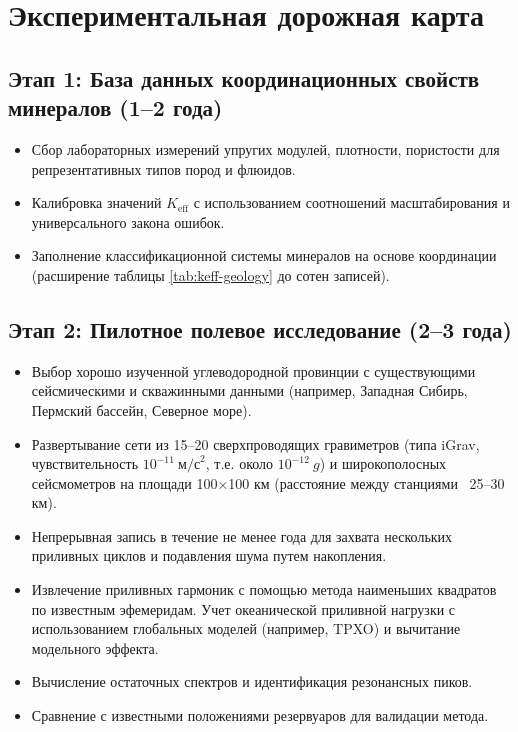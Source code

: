\documentclass[12pt,a4paper]{article}
\theoremstyle{remark}
\newcommand{\Keff}{K_{\mathrm{eff}}}
\begin{document}
	\section{Экспериментальная дорожная карта}
	\label{sec:roadmap}
	
	\subsection{Этап 1: База данных координационных свойств минералов (1–2 года)}
	
	\begin{itemize}
		\item Сбор лабораторных измерений упругих модулей, плотности, пористости для репрезентативных типов пород и флюидов.
		\item Калибровка значений $\Keff$ с использованием соотношений масштабирования и универсального закона ошибок.
		\item Заполнение классификационной системы минералов на основе координации (расширение таблицы \ref{tab:keff-geology} до сотен записей).
	\end{itemize}
	
	\subsection{Этап 2: Пилотное полевое исследование (2–3 года)}
	
	\begin{itemize}
		\item Выбор хорошо изученной углеводородной провинции с существующими сейсмическими и скважинными данными (например, Западная Сибирь, Пермский бассейн, Северное море).
		\item Развертывание сети из 15–20 сверхпроводящих гравиметров (типа iGrav, чувствительность \(10^{-11}\ \text{м/с}^2\), т.е. около \(10^{-12}\ g\)) и широкополосных сейсмометров на площади 100×100 км (расстояние между станциями ~25–30 км).
		\item Непрерывная запись в течение не менее года для захвата нескольких приливных циклов и подавления шума путем накопления.
		\item Извлечение приливных гармоник с помощью метода наименьших квадратов по известным эфемеридам. Учет океанической приливной нагрузки с использованием глобальных моделей (например, TPXO) и вычитание модельного эффекта.
		\item Вычисление остаточных спектров и идентификация резонансных пиков.
		\item Сравнение с известными положениями резервуаров для валидации метода.
	\end{itemize}
	
\end{document}
